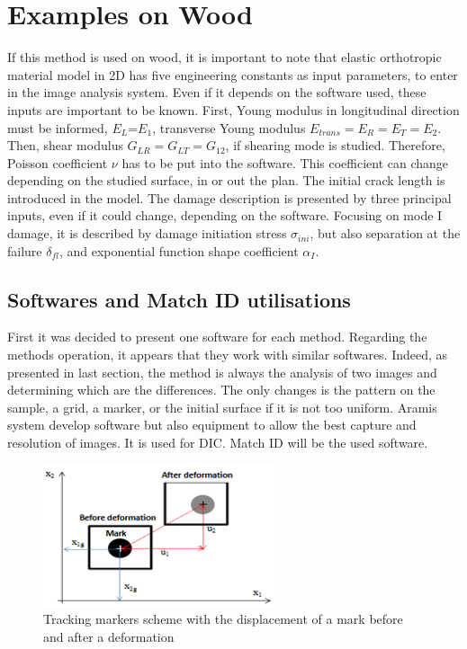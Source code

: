 \section{Examples on Wood}


If this method is used on wood, it is important to note that elastic orthotropic material model in 2D has five engineering constants as input parameters, to enter in the image analysis system. Even if it depends on the software used, these inputs are important to be known. First, Young modulus in longitudinal direction must be informed, $E_{L}$=$E_{1}$, transverse Young modulus $E_{trans}=E_{R}=E_{T}=E_{2}$. Then, shear modulus $G_{LR}=G_{LT}=G_{12}$, if shearing mode is studied. Therefore, Poisson coefficient $\nu$ has to be put into the software. This coefficient can change depending on the studied surface, in or out the plan. The initial crack length is introduced in the model. The damage description is presented by three principal inputs, even if it could change, depending on the software. Focusing on mode I damage, it is described by damage initiation stress $\sigma_{ini}$, but also separation at the failure $\delta_{fl}$, and exponential function shape coefficient $\alpha_{I}$. 


\subsection{Softwares and Match ID utilisations}

First it was decided to present one software for each method. Regarding the methods operation, it appears that they work with similar softwares. Indeed, as presented in last section, the method is always the analysis of two images and determining which are the differences. The only changes is the pattern on the sample, a grid, a marker, or the initial surface if it is not too uniform.
Aramis system develop software but also equipment to allow the best capture and resolution of images. It is used for DIC. 
Match ID will be the used software. 

\begin{figure}[th]
	\centering
	\includegraphics{Figures/Subset_Movement}
	\decoRule
	\caption[Subset Displacement]{Tracking markers scheme with the displacement of a mark before and after a deformation}
	\label{fig:Fig7}
\end{figure}

